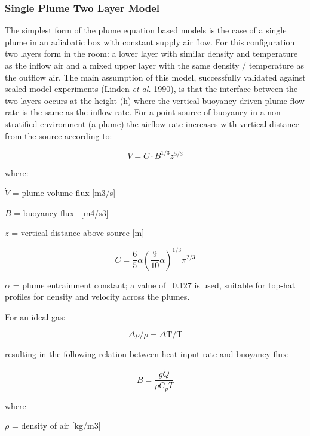 \subsubsection{Single Plume Two Layer Model}\label{single-plume-two-layer-model}

The simplest form of the plume equation based models is the case of a single plume in an adiabatic box with constant supply air flow. For this configuration two layers form in the room: a lower layer with similar density and temperature as the inflow air and a mixed upper layer with the same density / temperature as the outflow air. The main assumption of this model, successfully validated against scaled model experiments (Linden \emph{et al.} 1990), is that the interface between the two layers occurs at the height (h) where the vertical buoyancy driven plume flow rate is the same as the inflow rate. For a point source of buoyancy in a non-stratified environment (a plume) the airflow rate increases with vertical distance from the source according to:

\begin{equation}
\dot V = C\cdot {B^{1/3}}{z^{5/3}}
\end{equation}

where:

\(\dot V\) = plume volume flux {[}m3/s{]}

\(B\) = buoyancy flux~ {[}m4/s3{]}

\(z\) = vertical distance above source {[}m{]}

\begin{equation}
C = \frac{6}{5}\alpha {(\frac{9}{{10}}\alpha )^{1/3}}{\pi ^{2/3}}
\end{equation}

\(\alpha\) = plume entrainment constant; a value of~ 0.127 is used, suitable for top-hat profiles for density and velocity across the plumes.

For an ideal gas:

\begin{equation}
\Delta \rho /\rho  = \Delta \mathrm{T}/\mathrm{T}
\end{equation}

resulting in the following relation between heat input rate and buoyancy flux:

\begin{equation}
B = \frac{{g\dot Q}}{{\rho {C_p}T}}
\end{equation}

where

\(\rho\) = density of air {[}kg/m3{]}

